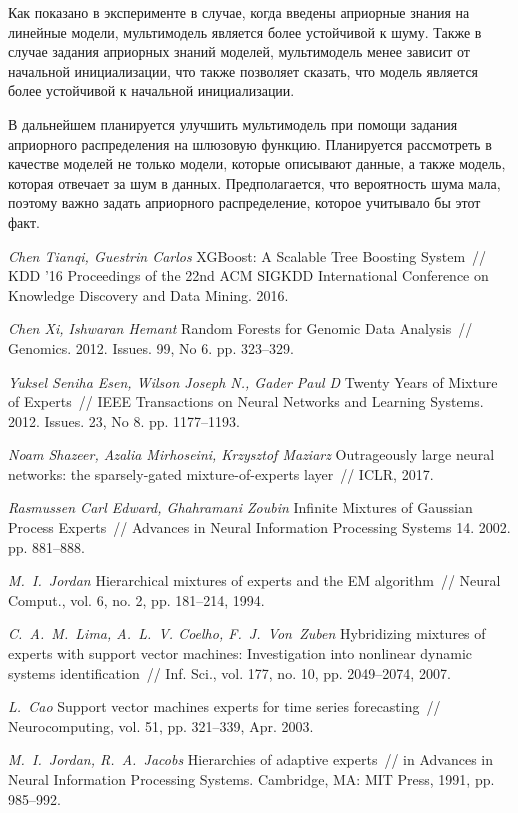 \documentclass[12pt, twoside]{article}
\numberwithin{equation}{section}
\begin{document}
Как показано в эксперименте в случае, когда введены априорные знания на линейные модели, мультимодель является более устойчивой к шуму. Также в случае задания априорных знаний моделей, мультимодель менее зависит от начальной инициализации, что также позволяет сказать, что модель является более устойчивой к начальной инициализации.

В дальнейшем планируется улучшить мультимодель при помощи задания априорного распределения на шлюзовую функцию. Планируется рассмотреть в качестве моделей не только модели, которые описывают данные, а также модель, которая отвечает за шум в данных. Предполагается, что вероятность шума мала, поэтому важно задать априорного распределение, которое учитывало бы этот факт.


\begin{thebibliography}{99}
	\textit{Chen Tianqi, Guestrin Carlos} XGBoost: A Scalable Tree Boosting System~// KDD ’16 Proceedings of the 22nd ACM SIGKDD International Conference on Knowledge Discovery and Data Mining. 2016.
	
	\textit{Chen Xi, Ishwaran Hemant} Random Forests for Genomic Data Analysis~// Genomics. 2012. Issues. 99, No 6. pp. 323--329.

	\textit{Yuksel Seniha Esen, Wilson Joseph N., Gader Paul D} Twenty Years of Mixture of Experts~// IEEE Transactions on Neural Networks and Learning Systems. 2012. Issues. 23, No 8. pp. 1177–1193.

	\textit{Noam Shazeer, Azalia Mirhoseini, Krzysztof Maziarz} Outrageously large neural networks: the sparsely-gated mixture-of-experts layer~// ICLR, 2017.

	\textit{Rasmussen Carl Edward, Ghahramani Zoubin} Infinite Mixtures of Gaussian Process Experts~// Advances in Neural Information Processing Systems 14. 2002. pp. 881–888.
	
	\textit{M.~I.~Jordan} Hierarchical mixtures of experts and the EM algorithm~// Neural Comput., vol. 6, no. 2, pp. 181–214, 1994.
	
	\textit{C.~A.~M.~Lima, A.~L.~V. Coelho, F.~J.~Von~Zuben} Hybridizing mixtures of experts with support vector machines: Investigation into nonlinear dynamic systems identification~// Inf. Sci., vol. 177, no. 10, pp. 2049–2074, 2007.

	\textit{L.~Cao} Support vector machines experts for time series forecasting~// Neurocomputing, vol. 51, pp. 321–339, Apr. 2003.
	
	\textit{M.~I.~Jordan, R.~A.~Jacobs} Hierarchies of adaptive experts~// in Advances in Neural Information Processing Systems. Cambridge, MA: MIT Press, 1991, pp. 985–992.

 \end{thebibliography}
\end{document}

